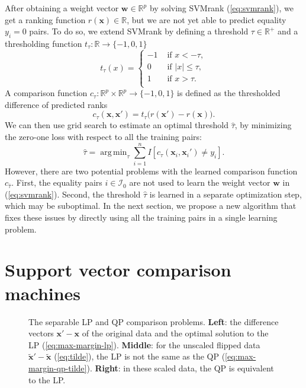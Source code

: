 \documentclass[twoside,11pt]{article}
\newcommand{\RR}{\mathbb R}
\DeclareMathOperator*{\argmin}{arg\,min}
\begin{document}
After obtaining a weight vector $\mathbf w\in\RR^p$ by solving SVMrank
(\ref{eq:svmrank}), we get a ranking function $r(\mathbf x)\in\RR$,
but we are not yet able to predict equality $y_i=0$ pairs. To do so,
we extend SVMrank by defining a threshold $\tau\in\RR^+$ and a
thresholding function $t_\tau:\RR\rightarrow\{-1,0,1\}$
\begin{equation}
  \label{eq:threshold}
  t_\tau(x) = 
  \begin{cases}
    -1 & \text{ if } x < -\tau, \\
    0 & \text{ if } |x| \leq \tau, \\
    1 & \text{ if } x > \tau. \\
  \end{cases}
\end{equation}
A comparison function $c_\tau:\RR^p\times \RR^p\rightarrow \{-1, 0,
1\}$ is defined as the thresholded difference of predicted ranks
\begin{equation}
  \label{eq:compare_general}
  c_\tau(\mathbf x, \mathbf x') = 
  t_\tau\big(
  r(\mathbf x') - r(\mathbf x)
  \big).
\end{equation}
We can then use grid search to estimate an optimal threshold $\hat
\tau$, by minimizing the zero-one loss with respect to all the
training pairs:
\begin{equation}
  \hat \tau = \argmin_{\tau}
  \sum_{i=1}^n
  I\left[ c_\tau(\mathbf x_i, \mathbf x_i') \neq y_i \right].
\end{equation}
However, there are two potential problems with the learned comparison
function $c_{\hat\tau}$. First, the equality pairs $i\in \mathcal I_0$ are not
used to learn the weight vector $\mathbf w$ in (\ref{eq:svmrank}). Second, the
threshold $\hat \tau$ is learned in a separate optimization step,
which may be suboptimal. In the next section, we propose a new
algorithm that fixes these issues by directly using all the
training pairs in a single learning problem.
\section{Support vector comparison machines}
\label{sec:svm-compare}

\begin{figure}[b!]
  \centering
  
  \vskip -1cm
  \caption{The separable LP and QP comparison problems. \textbf{Left}:
    the difference vectors $\mathbf x'-\mathbf x$ of the original data
    and the optimal solution to the LP
    (\ref{eq:max-margin-lp}). \textbf{Middle}: for the unscaled
    flipped data $\mathbf{\tilde x'}-\mathbf{ \tilde x}$
    (\ref{eq:tilde}), the LP is not the same as the QP
    (\ref{eq:max-margin-qp-tilde}). \textbf{Right}: in these scaled data,
    the QP is equivalent to the LP.}
  \label{fig:hard-margin}
\end{figure}
\end{document}
